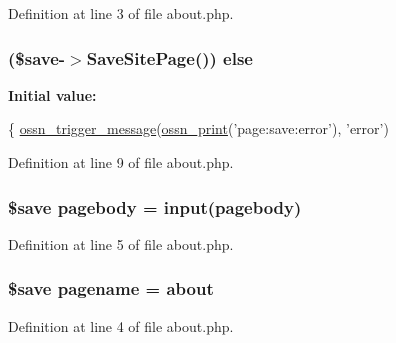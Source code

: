Definition at line 3 of file about.\+php.

\subsubsection[{\texorpdfstring{else}{else}}]{ (\$save-\/$>$Save\+Site\+Page()) else}\hypertarget{_ossn_site_pages_2actions_2edit_2about_8php_a3652d10f06e3bfc8edd1455fd0c357ae}{}\label{_ossn_site_pages_2actions_2edit_2about_8php_a3652d10f06e3bfc8edd1455fd0c357ae}
{\bfseries Initial value\+:}
\begin{DoxyCode}
\{
    \hyperlink{ossn_8lib_8system_8php_ab3f23f23f32f50c12e7aea0ffaccaac7}{ossn\_trigger\_message}(\hyperlink{ossn_8lib_8languages_8php_a2be5d1c4b695593a9b9067b96df2150a}{ossn\_print}(\textcolor{stringliteral}{'page:save:error'}), \textcolor{stringliteral}{'error'})
\end{DoxyCode}


Definition at line 9 of file about.\+php.

\subsubsection[{\texorpdfstring{pagebody}{pagebody}}]{\setlength{\rightskip}{0pt plus 5cm}\$save pagebody = {\bf input}(\textquotesingle{}pagebody\textquotesingle{})}\hypertarget{_ossn_site_pages_2actions_2edit_2about_8php_ac5e77655d4436fc87c23b803e772f55b}{}\label{_ossn_site_pages_2actions_2edit_2about_8php_ac5e77655d4436fc87c23b803e772f55b}


Definition at line 5 of file about.\+php.

\subsubsection[{\texorpdfstring{pagename}{pagename}}]{\setlength{\rightskip}{0pt plus 5cm}\$save pagename = \textquotesingle{}about\textquotesingle{}}\hypertarget{_ossn_site_pages_2actions_2edit_2about_8php_a80628cda62ee6fb56006a1a49ea33304}{}\label{_ossn_site_pages_2actions_2edit_2about_8php_a80628cda62ee6fb56006a1a49ea33304}


Definition at line 4 of file about.\+php.

